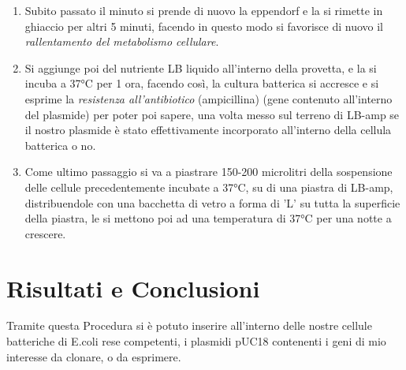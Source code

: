 \documentclass{article}
\begin{document}
\begin{enumerate}
\item Subito passato il minuto si prende di nuovo la eppendorf e la si rimette in ghiaccio per altri 5 minuti, facendo in questo modo si favorisce di nuovo il \textit{rallentamento del metabolismo cellulare}. 

\item Si aggiunge poi del nutriente LB liquido all'interno della provetta, e la si incuba a 37°C per 1 ora, facendo così, la cultura batterica si accresce e si esprime la \textit{resistenza all'antibiotico} (ampicillina) (gene contenuto all'interno del plasmide) per poter poi sapere, una volta messo sul terreno di LB-amp se il nostro plasmide è stato effettivamente incorporato all'interno della cellula batterica o no.

\item Come ultimo passaggio si va a piastrare 150-200 microlitri  della sospensione delle cellule precedentemente incubate a 37°C, su di una piastra di LB-amp, distribuendole con una bacchetta di vetro a forma di 'L' su tutta la superficie della piastra, le si mettono poi ad una temperatura di 37°C per una notte a crescere.    

\end{enumerate}


\section{Risultati e Conclusioni}

Tramite questa Procedura si è potuto inserire all'interno delle nostre cellule batteriche di E.coli rese competenti, i plasmidi pUC18 contenenti i geni di mio interesse da clonare, o da esprimere. 
\end{document}
